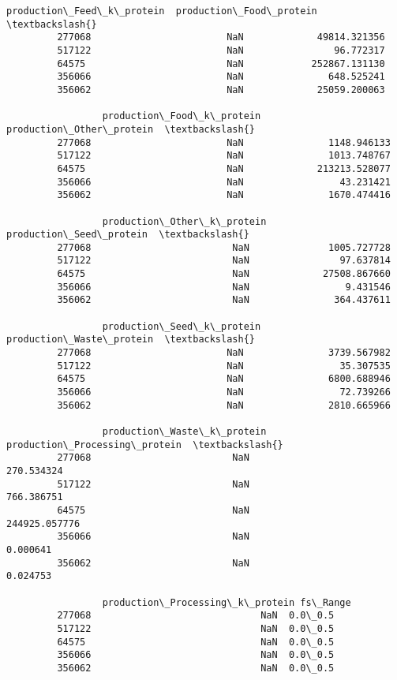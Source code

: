 \documentclass[11pt]{article}
\begin{document}
\begin{Verbatim}[commandchars=\\\{\}]
                 production\_Feed\_k\_protein  production\_Food\_protein  \textbackslash{}
         277068                        NaN             49814.321356   
         517122                        NaN                96.772317   
         64575                         NaN            252867.131130   
         356066                        NaN               648.525241   
         356062                        NaN             25059.200063   
         
                 production\_Food\_k\_protein  production\_Other\_protein  \textbackslash{}
         277068                        NaN               1148.946133   
         517122                        NaN               1013.748767   
         64575                         NaN             213213.528077   
         356066                        NaN                 43.231421   
         356062                        NaN               1670.474416   
         
                 production\_Other\_k\_protein  production\_Seed\_protein  \textbackslash{}
         277068                         NaN              1005.727728   
         517122                         NaN                97.637814   
         64575                          NaN             27508.867660   
         356066                         NaN                 9.431546   
         356062                         NaN               364.437611   
         
                 production\_Seed\_k\_protein  production\_Waste\_protein  \textbackslash{}
         277068                        NaN               3739.567982   
         517122                        NaN                 35.307535   
         64575                         NaN               6800.688946   
         356066                        NaN                 72.739266   
         356062                        NaN               2810.665966   
         
                 production\_Waste\_k\_protein  production\_Processing\_protein  \textbackslash{}
         277068                         NaN                     270.534324   
         517122                         NaN                     766.386751   
         64575                          NaN                  244925.057776   
         356066                         NaN                       0.000641   
         356062                         NaN                       0.024753   
         
                 production\_Processing\_k\_protein fs\_Range  
         277068                              NaN  0.0\_0.5  
         517122                              NaN  0.0\_0.5  
         64575                               NaN  0.0\_0.5  
         356066                              NaN  0.0\_0.5  
         356062                              NaN  0.0\_0.5  
\end{Verbatim}
        
\end{document}
